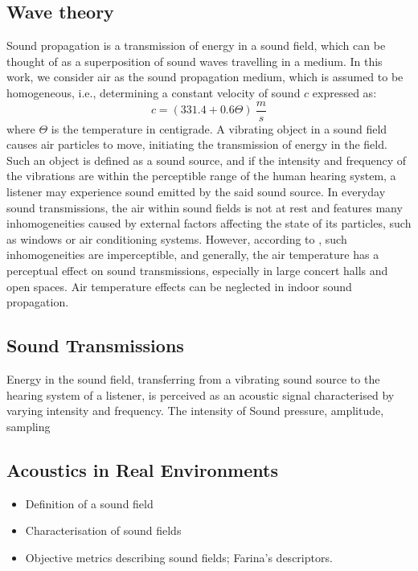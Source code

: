 \subsection{Wave theory}
Sound propagation is a transmission of energy in a sound field, which can be thought of as a superposition of sound waves travelling in a medium. In this work, we consider air as the sound propagation medium, which is assumed to be homogeneous, i.e., determining a constant velocity of sound $c$ expressed as: 
\begin{equation}
c = (331.4 + 0.6\Theta)~\frac{m}{s}   
\end{equation}
where $\Theta$ is the temperature in centigrade.
A vibrating object in a sound field causes air particles to move, initiating the transmission of energy in the field. Such an object is defined as a sound source, and if the intensity and frequency of the vibrations are within the perceptible range of the human hearing system, a listener may experience sound emitted by the said sound source.
In everyday sound transmissions, the air within sound fields is not at rest and features many inhomogeneities caused by external factors affecting the state of its particles, such as windows or air conditioning systems. However, according to \citep{kuttruff2016room}, such inhomogeneities are imperceptible, and generally, the air temperature has a perceptual effect on sound transmissions, especially in large concert halls and open spaces. Air temperature effects can be neglected in indoor sound propagation.

\subsection{Sound Transmissions}
Energy in the sound field, transferring from a vibrating sound source to the hearing system of a listener, is perceived as an acoustic signal characterised by varying intensity and frequency. 
The intensity of 
Sound pressure, amplitude, sampling 

\subsection{Acoustics in Real Environments}
\begin{itemize}
    \item Definition of a sound field
    \item Characterisation of sound fields
    \item Objective metrics describing sound fields; Farina's descriptors.
    
\end{itemize}


